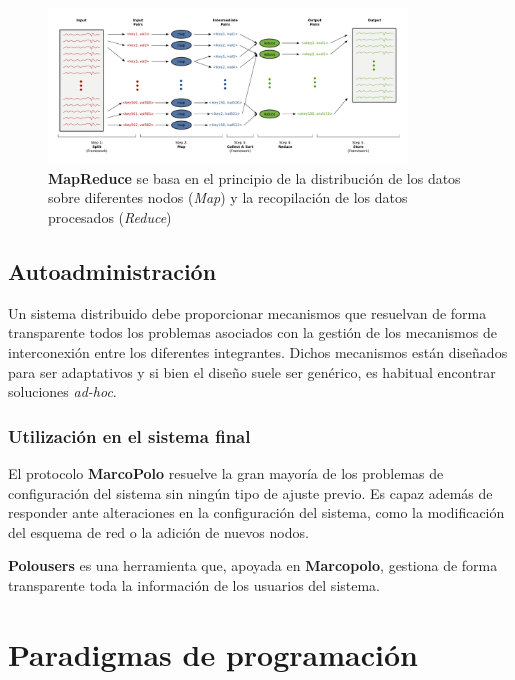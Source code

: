 
\begin{figure}[H]
  \centering
  \includegraphics[width=0.85\textwidth]{Chapter2/Figures/map-reduce}
  \caption[MapReduce]{\textbf{MapReduce} se basa en el principio de la distribución de los datos sobre diferentes nodos (\textit{Map}) y la recopilación de los datos procesados (\textit{Reduce})}
  \label{fig:mapreduce}
\end{figure}

\subsection{Autoadministración}
\label{teoria:autoadministracion}

Un sistema distribuido debe proporcionar mecanismos que resuelvan de forma transparente todos los problemas asociados con la gestión de los mecanismos de interconexión entre los diferentes integrantes. Dichos mecanismos están diseñados para ser adaptativos y si bien el diseño suele ser genérico, es habitual encontrar soluciones \textit{ad-hoc}.

\subsubsection{Utilización en el sistema final}

El protocolo \textbf{MarcoPolo} resuelve la gran mayoría de los problemas de configuración del sistema sin ningún tipo de ajuste previo. Es capaz además de responder ante alteraciones en la configuración del sistema, como la modificación del esquema de red o la adición de nuevos nodos.

\textbf{Polousers} es una herramienta que, apoyada en \textbf{Marcopolo}, gestiona de forma transparente toda la información de los usuarios del sistema.

\section{Paradigmas de programación}

